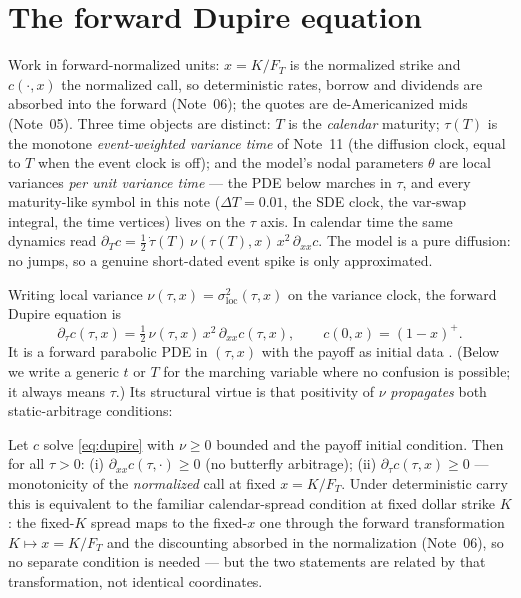 \documentclass[11pt]{article}
\begin{document}
\section{The forward Dupire equation}
\label{sec:dupire}

\begin{assumption}
\label{ass:units}
Work in forward-normalized units: $x=K/F_T$ is the normalized strike and
$c(\cdot,x)$ the normalized call, so deterministic rates, borrow and dividends
are absorbed into the forward (Note~06); the quotes are de-Americanized mids
(Note~05). Three time objects are distinct: $T$ is the \emph{calendar}
maturity; $\tau(T)$ is the monotone \emph{event-weighted variance time} of
Note~11 (the diffusion clock, equal to $T$ when the event clock is off); and
the model's nodal parameters $\theta$ are local variances \emph{per unit
variance time} --- the PDE below marches in $\tau$, and every maturity-like
symbol in this note ($\Delta T=0.01$, the SDE clock, the var-swap integral,
the time vertices) lives on the $\tau$ axis. In calendar time the same
dynamics read $\partial_Tc=\tfrac12\,\dot\tau(T)\,\nu(\tau(T),x)\,x^2\,
\partial_{xx}c$. The model is a pure diffusion: no jumps, so a genuine
short-dated event spike is only approximated.
\end{assumption}

Writing local variance $\nu(\tau,x)=\sigma_{\text{loc}}^2(\tau,x)$ on the
variance clock, the forward Dupire equation is
\begin{equation}
\boxed{\;\partial_\tau c(\tau,x)=\tfrac12\,\nu(\tau,x)\,x^2\,\partial_{xx}c(\tau,x),\qquad
c(0,x)=(1-x)^+.\;}
\label{eq:dupire}
\end{equation}
It is a forward parabolic PDE in $(\tau,x)$ with the payoff as initial data
\cite{Dupire1994}. (Below we write a generic $t$ or $T$ for the marching
variable where no confusion is possible; it always means $\tau$.) Its
structural virtue is that positivity of $\nu$ \emph{propagates} both
static-arbitrage conditions:

\begin{proposition}
\label{prop:propagate}
Let $c$ solve \eqref{eq:dupire} with $\nu\ge0$ bounded and the payoff initial
condition. Then for all $\tau>0$: (i) $\partial_{xx}c(\tau,\cdot)\ge0$ (no
butterfly arbitrage); (ii) $\partial_\tau c(\tau,x)\ge0$ --- monotonicity of
the \emph{normalized} call at fixed $x=K/F_T$. Under deterministic carry this
is equivalent to the familiar calendar-spread condition at fixed dollar
strike $K$: the fixed-$K$ spread maps to the fixed-$x$ one through the
forward transformation $K\mapsto x=K/F_T$ and the discounting absorbed in the
normalization (Note~06), so no separate condition is needed --- but the two
statements are related by that transformation, not identical coordinates.
\end{proposition}
\end{document}
